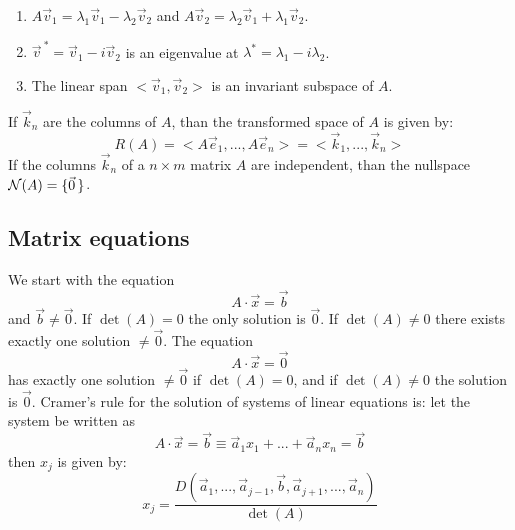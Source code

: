 \documentclass[a4paper,fancyheadings,twoside]{report}
\begin{document}
\begin{enumerate}
\item $A\vec{v}_1=\lambda_1\vec{v}_1-\lambda_2\vec{v}_2$ and $A\vec{v}_2=\lambda_2\vec{v}_1+\lambda_1\vec{v}_2$.
\item $\vec{v}^{~*}=\vec{v}_1-i\vec{v}_2$ is an eigenvalue at $\lambda^*=\lambda_1-i\lambda_2$.
\item The linear span $<\vec{v}_1,\vec{v}_2>$ is an invariant subspace of $A$.
\end{enumerate}
If $\vec{k}_n$ are the columns of $A$, than the transformed space of $A$ is
given by:
\[
R(A)=<A\vec{e}_1,...,A\vec{e}_n>=<\vec{k}_1,...,\vec{k}_n>
\]
If the columns $\vec{k}_n$ of a $n\times m$ matrix $A$ are independent, than
the nullspace ${\cal N}(A)=\{\vec{0}\,\}$.

\subsection{Matrix equations}
We start with the equation
\[
A\cdot\vec{x}=\vec{b}
\]
and $\vec{b}\neq\vec{0}$. If $\det(A)=0$ the only solution is $\vec{0}$. If
$\det(A)\neq0$ there exists exactly one solution $\neq\vec{0}$.
\npar
The equation
\[
A\cdot\vec{x}=\vec{0}
\]
has exactly one solution $\neq\vec{0}$ if $\det(A)=0$, and if
$\det(A)\neq0$ the solution is $\vec{0}$.
\npar
Cramer's rule for the solution of systems of linear equations is: let the
system be written as
\[
A\cdot\vec{x}=\vec{b}\equiv\vec{a}_1x_1+...+\vec{a}_nx_n=\vec{b}
\]
then $x_j$ is given by:
\[
x_j=\frac{D(\vec{a}_1,...,\vec{a}_{j-1},\vec{b},\vec{a}_{j+1},...,\vec{a}_n)}{\det(A)}
\]
\end{document}

